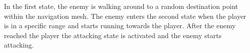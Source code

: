 \documentclass[a4paper,11pt,oneside]{scrreprt}
\begin{document}
In the first state, the enemy is walking around to a random destination point within the navigation mesh. The enemy enters the second state when the player is in a specific range and starts running towards the player. After the enemy reached the player the attacking state is activated and the enemy starts attacking.
\inputminted[fontsize=\footnotesize,linenos]{csharp}{code/Enemy.cs}


\clearpage
{}
{}
\listoffigures

\clearpage
{}
{}
\printbibliography
\end{document}
